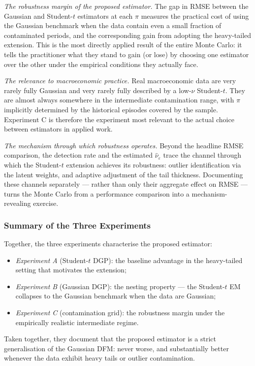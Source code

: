 \documentclass[11pt, a4paper, oneside]{article}
\begin{document}
\textit{The robustness margin of the proposed estimator.} The
gap in RMSE between the Gaussian and Student-$t$ estimators at
each $\pi$ measures the practical cost of using the Gaussian
benchmark when the data contain even a small fraction of
contaminated periods, and the corresponding gain from adopting
the heavy-tailed extension. This is the most directly applied
result of the entire Monte Carlo: it tells the practitioner what
they stand to gain (or lose) by choosing one estimator over the
other under the empirical conditions they actually face.

\textit{The relevance to macroeconomic practice.} Real
macroeconomic data are very rarely fully Gaussian and very rarely
fully described by a low-$\nu$ Student-$t$. They are almost
always somewhere in the intermediate contamination range, with
$\pi$ implicitly determined by the historical episodes covered
by the sample. Experiment C is therefore the experiment most
relevant to the actual choice between estimators in applied
work.

\textit{The mechanism through which robustness operates.} Beyond
the headline RMSE comparison, the detection rate and the
estimated $\hat{\nu}_\varepsilon$ trace the channel through which
the Student-$t$ extension achieves its robustness: outlier
identification via the latent weights, and adaptive adjustment of
the tail thickness. Documenting these channels separately —
rather than only their aggregate effect on RMSE — turns the Monte
Carlo from a performance comparison into a mechanism-revealing
exercise.

\subsubsection{Summary of the Three Experiments}

Together, the three experiments characterise the proposed estimator:
\begin{itemize}[leftmargin=1.5em, itemsep=3pt]
    \item \emph{Experiment A} (Student-$t$ DGP): the baseline
          advantage in the heavy-tailed setting that motivates the
          extension;
    \item \emph{Experiment B} (Gaussian DGP): the nesting property
          — the Student-$t$ EM collapses to the Gaussian benchmark
          when the data are Gaussian;
    \item \emph{Experiment C} (contamination grid): the robustness
          margin under the empirically realistic intermediate
          regime.
\end{itemize}
Taken together, they document that the proposed estimator is a
strict generalisation of the Gaussian DFM: never worse, and
substantially better whenever the data exhibit heavy tails or
outlier contamination.
\end{document}
